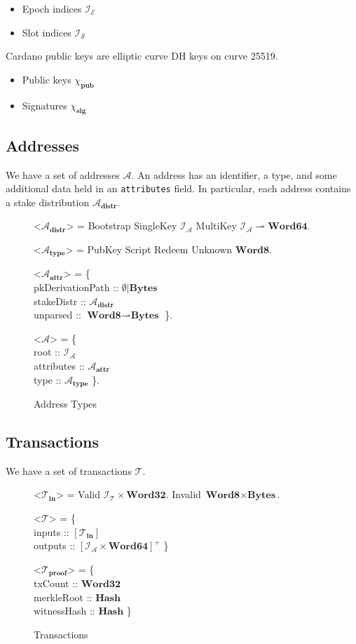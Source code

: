\documentclass{article}
\def\fld{\\\llap{,\quad}}%
\newcommand{\rhu}{\rightharpoonup}
\newcommand{\lists}[1]{\left[{#1}\right]}
\newcommand{\nelists}[1]{\left[{#1}\right]^+}
\newcommand{\maybe}[1]{\emptyset | {#1}}
\newcommand{\idsof}[1]{\mathcal{I}\!_#1}
\newcommand{\txids}{\idsof{\txs}}
\newcommand{\agentids}{\idsof{\agents}}
\newcommand{\epochids}{\idsof{\mathcal{E}}}
\newcommand{\slotids}{\idsof{\mathcal{S}}}
\newcommand{\pubkey}{\chi_{\textbf{pub}}}
\newcommand{\signature}{\chi_{\textbf{sig}}}
\newcommand{\agents}{\mathcal{A}}
\newcommand{\txs}{\mathcal{T}}
\newcommand{\txins}{\txs_{\textbf{in}}}
\newcommand{\txpf}{\txs_{\textbf{proof}}}
\newcommand{\hstype}[1]{\textbf{#1}}
\newcommand{\Word}[1]{\hstype{Word#1}}
\newcommand{\hash}{\hstype{Hash}}
\newcommand{\Bytes}{\hstype{Bytes}}
\begin{document}
\begin{itemize}
\item Epoch indices $\epochids$
\item Slot indices $\slotids$
\end{itemize}

Cardano public keys are elliptic curve DH keys on curve 25519.

\begin{itemize}
\item Public keys $\pubkey$
\item Signatures $\signature$
\end{itemize}

\subsection{Addresses}

We have a set of addresses $\agents$. An address has an identifier, a type, and
some additional data held in an \verb|attributes| field. In particular, each
address contains a stake distribution $\agents_{\textbf{distr}}$.

\begin{figure}[H]
  \begin{grammar}
    <$\agents_{\textbf{distr}}$> = Bootstrap
      \alt SingleKey $\agentids$
      \alt MultiKey $\agentids \rhu \Word{64}$.

    <$\agents_{\textbf{type}}$> = PubKey \alt Script \alt Redeem \alt Unknown $\Word{8}$.

    <$\agents_{\textbf{attr}}$> = \{
    \fld pkDerivationPath :: $\maybe{\Bytes}$
    \fld stakeDistr :: $\agents_{\textbf{distr}}$
    \fld unparsed :: $\Word{8}\rhu\Bytes$
    \}.

    <$\agents$> = \{
    \fld root :: $\agentids$
    \fld attributes :: $\agents_{\textbf{attr}}$
    \fld type :: $\agents_{\textbf{type}}$
    \}.
  \end{grammar}

  \caption{Address Types}
\end{figure}

\subsection{Transactions}

We have a set of transactions $\txs$.

\begin{figure}[H]
  \caption{Transactions}
  \label{fig:txin}
  \begin{grammar}
    <$\txins$> = Valid $\txids\times\Word{32}$.
    \alt Invalid $\Word{8}\times\Bytes$.

    <$\txs$> = \{
    \fld inputs :: $\lists{\txins}$
    \fld outputs :: $\nelists{\agentids \times \Word{64}}$
    \}

    <$\txpf$> = \{
    \fld txCount :: $\Word{32}$
    \fld merkleRoot :: $\hash$
    \fld witnessHash :: $\hash$
    \}
  \end{grammar}
\end{figure}
\end{document}
